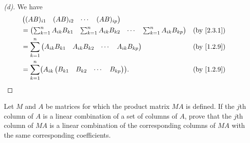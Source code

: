 \begin{proof}[(d)]
  We have
  \begin{align*}
     & \begin{pmatrix}
         (AB)_{i 1} & (AB)_{i 2} & \cdots & (AB)_{i p}
       \end{pmatrix}                                                                              \\
     & = \begin{pmatrix}
           \sum_{k = 1}^n A_{i k} B_{k 1} & \sum_{k = 1}^n A_{i k} B_{k 2} & \cdots & \sum_{k = 1}^n A_{i k} B_{k p}
         \end{pmatrix} &  & \by{2.3.1}                \\
     & = \sum_{k = 1}^n \begin{pmatrix}
                          A_{i k} B_{k 1} & A_{i k} B_{k 2} & \cdots & A_{i k} B_{k p}
                        \end{pmatrix}                                              &  & \by{1.2.9}                                \\
     & = \sum_{k = 1}^n \pa{A_{i k} \begin{pmatrix}
                                        B_{k 1} & B_{k 2} & \cdots & B_{k p}
                                      \end{pmatrix}}.                                                               &  & \by{1.2.9}
  \end{align*}
\end{proof}

\begin{ex}\label{ex:2.3.15}
  Let \(M\) and \(A\) be matrices for which the product matrix \(MA\) is defined.
  If the \(j\)th column of \(A\) is a linear combination of a set of columns of \(A\), prove that the \(j\)th column of \(MA\) is a linear combination of the corresponding columns of \(MA\) with the same corresponding coefficients.
\end{ex}

